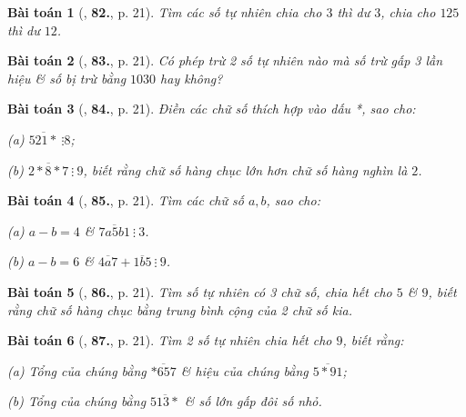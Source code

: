 \documentclass{article}
\numberwithin{equation}{section}
\newtheorem{baitoan}{Bài toán}[section]
\begin{document}
\begin{baitoan}[\cite{Binh_Toan_6_tap_1}, \textbf{82.}, p. 21]
	Tìm các số tự nhiên chia cho $3$ thì dư $3$, chia cho $125$ thì dư $12$.
\end{baitoan}

\begin{baitoan}[\cite{Binh_Toan_6_tap_1}, \textbf{83.}, p. 21]
	Có phép trừ 2 số tự nhiên nào mà số trừ gấp 3 lần hiệu \& số bị trừ bằng $1030$ hay không?
\end{baitoan}

\begin{baitoan}[\cite{Binh_Toan_6_tap_1}, \textbf{84.}, p. 21]
	Điền các chữ số thích hợp vào dấu *, sao cho:
	\begin{enumerate*}
		\item[(a)] $\overline{521*}\ \vdots 8$;
		\item[(b)] $\overline{2*8*7}\ \vdots\ 9$, biết rằng chữ số hàng chục lớn hơn chữ số hàng nghìn là $2$.
	\end{enumerate*}
\end{baitoan}

\begin{baitoan}[\cite{Binh_Toan_6_tap_1}, \textbf{85.}, p. 21]
	Tìm các chữ số $a,b$, sao cho:
	\begin{enumerate*}
		\item[(a)] $a - b =4$ \& $\overline{7a5b1}\ \vdots\ 3$.
		\item[(b)] $a - b = 6$ \& $\overline{4a7} + \overline{1b5}\ \vdots\ 9$.
	\end{enumerate*}
\end{baitoan}

\begin{baitoan}[\cite{Binh_Toan_6_tap_1}, \textbf{86.}, p. 21]
	Tìm số tự nhiên có 3 chữ số, chia hết cho $5$ \& $9$, biết rằng chữ số hàng chục bằng trung bình cộng của 2 chữ số kia.
\end{baitoan}

\begin{baitoan}[\cite{Binh_Toan_6_tap_1}, \textbf{87.}, p. 21]
	Tìm 2 số tự nhiên chia hết cho $9$, biết rằng:
	\begin{enumerate*}
		\item[(a)] Tổng của chúng bằng $\overline{*657}$ \& hiệu của chúng bằng $\overline{5*91}$;
		\item[(b)] Tổng của chúng bằng $\overline{513*}$ \& số lớn gấp đôi số nhỏ.
	\end{enumerate*}
\end{baitoan}
\end{document}
